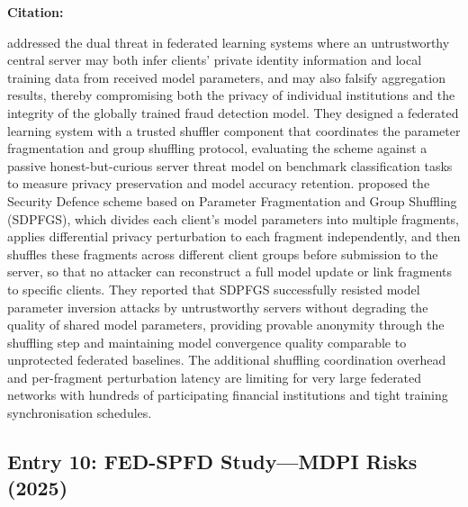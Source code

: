 \documentclass[12pt, a4paper]{article}
\newenvironment{surveyentry}[1]{%
  \vspace{6pt}
  \noindent\textbf{\color{navyblue}#1}\par
  \vspace{2pt}
  \noindent\hspace{1em}%
  \begin{minipage}[t]{0.97\linewidth}
}{%
  \end{minipage}
  \vspace{10pt}
}
\begin{document}
\begin{surveyentry}{Citation: \cite{guo2025sdpfgs}}
\cite{guo2025sdpfgs} addressed the dual threat in federated learning systems where an untrustworthy central server may both infer clients' private identity information and local training data from received model parameters, and may also falsify aggregation results, thereby compromising both the privacy of individual institutions and the integrity of the globally trained fraud detection model. They designed a federated learning system with a trusted shuffler component that coordinates the parameter fragmentation and group shuffling protocol, evaluating the scheme against a passive honest-but-curious server threat model on benchmark classification tasks to measure privacy preservation and model accuracy retention. \cite{guo2025sdpfgs} proposed the Security Defence scheme based on Parameter Fragmentation and Group Shuffling (SDPFGS), which divides each client's model parameters into multiple fragments, applies differential privacy perturbation to each fragment independently, and then shuffles these fragments across different client groups before submission to the server, so that no attacker can reconstruct a full model update or link fragments to specific clients. They reported that SDPFGS successfully resisted model parameter inversion attacks by untrustworthy servers without degrading the quality of shared model parameters, providing provable anonymity through the shuffling step and maintaining model convergence quality comparable to unprotected federated baselines. The additional shuffling coordination overhead and per-fragment perturbation latency are limiting for very large federated networks with hundreds of participating financial institutions and tight training synchronisation schedules.
\end{surveyentry}

\subsection*{Entry 10: FED-SPFD Study---MDPI Risks (2025)}
\end{document}
